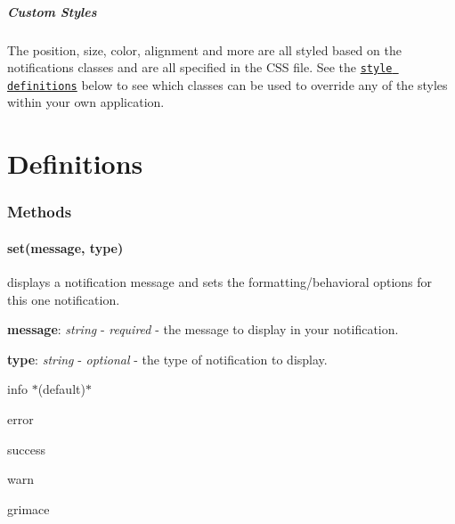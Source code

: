 

\subparagraph*{Custom Styles}

The position, size, color, alignment and more are all styled based on the notification\textquotesingle{}s classes and are all specified in the C\+SS file. See the \href{#styles}{\tt style definitions} below to see which classes can be used to override any of the styles within your own application.

\section*{Definitions }

\subsubsection*{Methods}

\paragraph*{set(message, type)}

displays a notification message and sets the formatting/behavioral options for this one notification.
\begin{DoxyItemize}
\item {\bfseries message}\+: {\itshape string} -\/ {\itshape required} -\/ the message to display in your notification.
\item {\bfseries type}\+: {\itshape string} -\/ {\itshape optional} -\/ the type of notification to display.
\begin{DoxyItemize}
\item info $\ast$(default)$\ast$
\item error
\item success
\item warn
\item grimace
\end{DoxyItemize}
\end{DoxyItemize}

